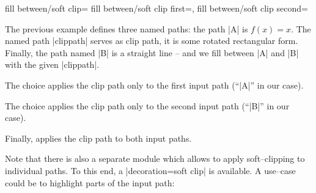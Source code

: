 \begin{tikzkeylist}{%
	fill between/soft clip=
	fill between/soft clip first=,
	fill between/soft clip second=%
}
\begin{codeexample}[]
\end{codeexample}
	\noindent The previous example defines three named paths: the path |A| is $f(x) = x$. The named path |clippath| serves as clip path, it is some rotated rectangular form. Finally, the path named |B| is a straight line -- and we fill between |A| and |B| with the given |clippath|. 
	
	The choice  applies the clip path only to the first input path (``|A|'' in our case).

	The choice  applies the clip path only to the second input path (``|B|'' in our case).

	Finally,  applies the clip path to both input paths.
\begin{codeexample}[]
\end{codeexample}


	Note that there is also a separate module which allows to apply soft--clipping to individual paths. To this end, a |decoration=soft clip| is available. A use--case could be to highlight parts of the input path:
\begin{codeexample}[]
\end{codeexample}
\end{tikzkeylist}
